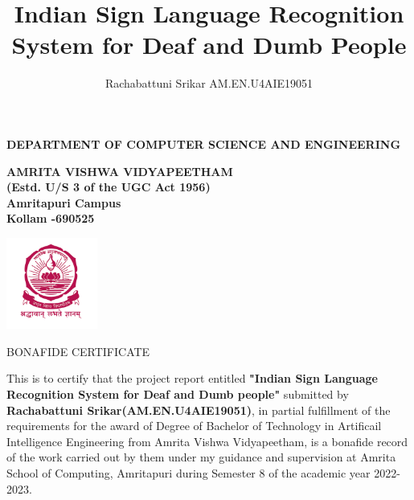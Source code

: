 \documentclass[oneside,12pt]{Classes/CUEDthesisPSnPDF}
\title{Indian Sign Language Recognition System for Deaf and Dumb People}
\author{Rachabattuni Srikar AM.EN.U4AIE19051}
\begin{document}
\maketitle


\begin{center}


	{\normalsize {\bfseries{DEPARTMENT OF COMPUTER SCIENCE AND ENGINEERING\\[1ex]}}}


	{\normalsize {\bfseries{AMRITA VISHWA VIDYAPEETHAM \\ (Estd. U/S 3 of the UGC Act 1956) \\[1ex]Amritapuri  Campus \\[1ex] Kollam -690525\\[1ex]}}}

	\includegraphics[width=30mm]{UNIVEMBLEM.png}


	\rmfamily\bfseries\upshape\Large

	BONAFIDE CERTIFICATE \\[2ex] %

\end{center}


\rmfamily\mdseries\upshape\normalsize

This is to certify that the project report entitled \textbf{"Indian Sign Language Recognition System for Deaf and Dumb people"} submitted by \textbf{Rachabattuni Srikar(AM.EN.U4AIE19051)}, in partial fulfillment of the requirements for the award of Degree of Bachelor of Technology in Artificail Intelligence Engineering from Amrita Vishwa Vidyapeetham, is a bonafide record of the work carried out by them under my guidance and supervision at Amrita School of Computing, Amritapuri during Semester 8 of the academic year 2022-2023.
\end{document}
